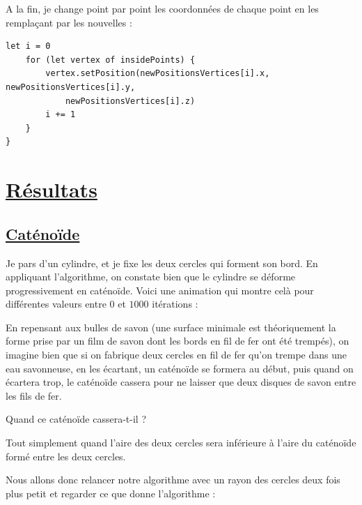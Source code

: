\documentclass {report}
\begin{document}
A la fin, je change point par point les coordonnées de chaque point en les remplaçant par les nouvelles : 

\begin{lstlisting}[frame=single, framerule=0pt]
	let i = 0
	for (let vertex of insidePoints) {
		vertex.setPosition(newPositionsVertices[i].x, newPositionsVertices[i].y,
			newPositionsVertices[i].z)
		i += 1
	}
}
\end{lstlisting}

\section[Résultats]{\uline{Résultats}}

\subsection[Caténoïde]{\uline{Caténoïde}}

Je pars d'un cylindre, et je fixe les deux cercles qui forment son bord. En appliquant l'algorithme, on constate bien que le cylindre se déforme progressivement en caténoïde. 
Voici une animation qui montre celà pour différentes valeurs entre $0$ et $1000$ itérations : 

\begin{center}
\end{center}

En repensant aux bulles de savon (une surface minimale est théoriquement la forme prise par un film de savon dont les bords en fil de fer ont été trempés), on imagine bien que si on fabrique deux cercles en fil de fer qu'on trempe dans une eau savonneuse, en les écartant, un caténoïde se formera au début, puis quand on écartera trop, le caténoïde cassera pour ne laisser que deux disques de savon entre les fils de fer. 

Quand ce caténoïde cassera-t-il ?

\noindent Tout simplement quand l'aire des deux cercles sera inférieure à l'aire du caténoïde formé entre les deux cercles. 

Nous allons donc relancer notre algorithme avec un rayon des cercles deux fois plus petit et regarder ce que donne l'algorithme :
\newpage
\end{document}
